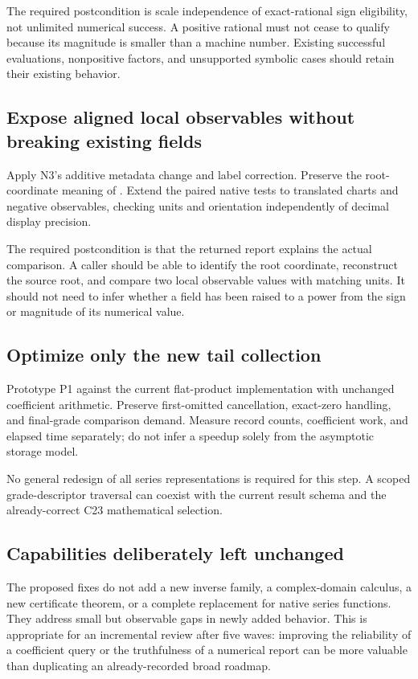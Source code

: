 \documentclass[11pt,letterpaper]{article}
\newcommand{\code}[1]{\texttt{\detokenize{#1}}}
\begin{document}
The required postcondition is scale independence of exact-rational sign eligibility, not unlimited numerical success. A positive rational must not cease to qualify because its magnitude is smaller than a machine number. Existing successful evaluations, nonpositive factors, and unsupported symbolic cases should retain their existing behavior.

\subsection{Expose aligned local observables without breaking existing fields}
Apply N3's additive metadata change and label correction. Preserve the root-coordinate meaning of \code{LocalRoot}. Extend the paired native tests to translated charts and negative observables, checking units and orientation independently of decimal display precision.

The required postcondition is that the returned report explains the actual comparison. A caller should be able to identify the root coordinate, reconstruct the source root, and compare two local observable values with matching units. It should not need to infer whether a field has been raised to a power from the sign or magnitude of its numerical value.

\subsection{Optimize only the new tail collection}
Prototype P1 against the current flat-product implementation with unchanged coefficient arithmetic. Preserve first-omitted cancellation, exact-zero handling, and final-grade comparison demand. Measure record counts, coefficient work, and elapsed time separately; do not infer a speedup solely from the asymptotic storage model.

No general redesign of all series representations is required for this step. A scoped grade-descriptor traversal can coexist with the current result schema and the already-correct C23 mathematical selection.

\subsection{Capabilities deliberately left unchanged}
The proposed fixes do not add a new inverse family, a complex-domain calculus, a new certificate theorem, or a complete replacement for native series functions. They address small but observable gaps in newly added behavior. This is appropriate for an incremental review after five waves: improving the reliability of a coefficient query or the truthfulness of a numerical report can be more valuable than duplicating an already-recorded broad roadmap.
\end{document}
